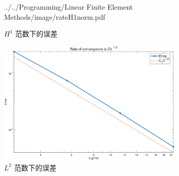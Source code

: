 \documentclass[a4paper]{article}
\begin{document}
\begin{enumerate}
\begin{figure}[htbp]
                            {../../Programming/Linear Finite Element Methods/image/rateH1norm.pdf}
                    \caption{$H^1$ 范数下的误差}
                    \label{$H^1$ 范数下的误差}
                \end{figure}
                \begin{figure}[htbp]
                    \centering
                    \includegraphics[width=0.8\textwidth]
                            {../../Programming/Linear Finite Element Methods/image/rateL2norm.pdf}
                    \caption{$L^2$ 范数下的误差}
                    \label{$L^2$ 范数下的误差}
                \end{figure}
\end{enumerate}


\printbibliography
\end{document}
